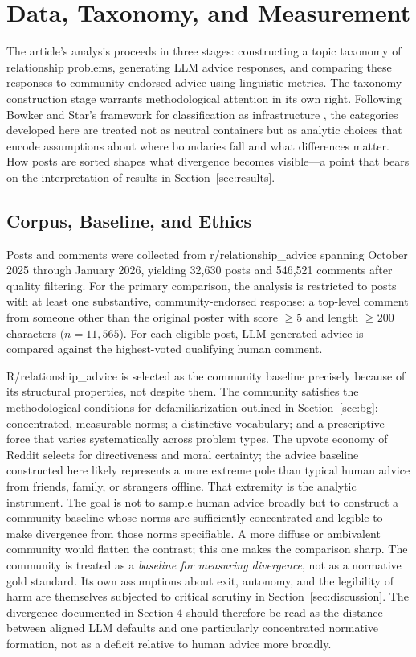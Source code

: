 \section{Data, Taxonomy, and Measurement}
\label{sec:methods}

The article's analysis proceeds in three stages: constructing a topic taxonomy of relationship problems, generating LLM advice responses, and comparing these responses to community-endorsed advice using linguistic metrics. The taxonomy construction stage warrants methodological attention in its own right. Following Bowker and Star's framework for classification as infrastructure \citep{bowker1999sorting}, the categories developed here are treated not as neutral containers but as analytic choices that encode assumptions about where boundaries fall and what differences matter. How posts are sorted shapes what divergence becomes visible---a point that bears on the interpretation of results in Section~\ref{sec:results}.

\subsection{Corpus, Baseline, and Ethics}

Posts and comments were collected from r/relationship\_advice spanning October 2025 through January 2026, yielding 32,630 posts and 546,521 comments after quality filtering. For the primary comparison, the analysis is restricted to posts with at least one substantive, community-endorsed response: a top-level comment from someone other than the original poster with score $\geq 5$ and length $\geq 200$ characters ($n = 11{,}565$). For each eligible post, LLM-generated advice is compared against the highest-voted qualifying human comment.

R/relationship\_advice is selected as the community baseline precisely because of its structural properties, not despite them. The community satisfies the methodological conditions for defamiliarization outlined in Section~\ref{sec:bg}: concentrated, measurable norms; a distinctive vocabulary; and a prescriptive force that varies systematically across problem types. The upvote economy of Reddit selects for directiveness and moral certainty; the advice baseline constructed here likely represents a more extreme pole than typical human advice from friends, family, or strangers offline. That extremity is the analytic instrument. The goal is not to sample human advice broadly but to construct a community baseline whose norms are sufficiently concentrated and legible to make divergence from those norms specifiable. A more diffuse or ambivalent community would flatten the contrast; this one makes the comparison sharp. The community is treated as a \textit{baseline for measuring divergence}, not as a normative gold standard. Its own assumptions about exit, autonomy, and the legibility of harm are themselves subjected to critical scrutiny in Section~\ref{sec:discussion}. The divergence documented in Section 4 should therefore be read as the distance between aligned LLM defaults and one particularly concentrated normative formation, not as a deficit relative to human advice more broadly.

